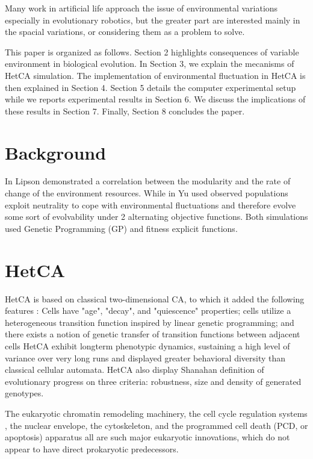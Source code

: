 \documentclass[letterpaper]{article}
\begin{document}
Many work in artificial life approach the issue of environmental variations especially in evolutionary robotics\cite{floreano2000evolutionary}, but the greater part are interested mainly in the spacial variations, or considering them as a problem to solve.

This paper is organized as follows. Section 2 highlights consequences of variable environment in biological evolution. In Section 3, we explain the mecanisms of HetCA simulation. The implementation of environmental fluctuation in HetCA  is then explained in Section 4. Section 5 details the computer experimental setup while we reports experimental results in Section 6. We discuss the implications of these results in Section 7. Finally, Section 8 concludes the paper.


\section{Background}
In \cite{lipson2002origin} Lipson demonstrated a correlation between the modularity and the rate of change of the environment resources. While in \cite{yu2007program} Yu used  observed populations exploit neutrality to cope with environmental fluctuations and therefore evolve some sort of evolvability under 2 alternating objective functions. Both simulations used Genetic Programming (GP) and fitness explicit functions.

\section{HetCA}
HetCA is based on classical two-dimensional CA, to which it added the following features : Cells have "age", "decay", and "quiescence" properties; cells utilize a heterogeneous transition function inspired by linear genetic programming; and there exists a notion of genetic transfer of transition functions between adjacent cells
HetCA exhibit longterm phenotypic dynamics, sustaining a high level of variance
over very long runs and displayed greater behavioral diversity than classical cellular automata\cite{medernach2013long}. HetCA also display Shanahan \cite{shanahan2012evolutionary} definition of evolutionary progress on three criteria: robustness, size and density of generated genotypes\cite{medernach2015evolutionary}.

The eukaryotic chromatin remodeling machinery, the cell cycle regulation
systems \cite{koonin2002origin}, the nuclear envelope, the cytoskeleton, and the
programmed cell death (PCD, or apoptosis) apparatus all are
such major eukaryotic innovations, which do not appear to
have direct prokaryotic predecessors. 
\end{document}

